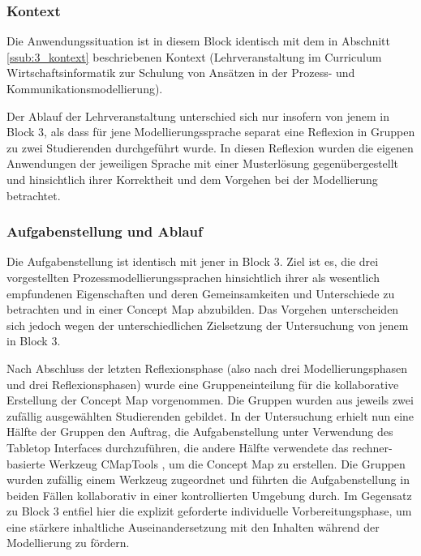 \subsubsection{Kontext} %
\label{ssub:5_kontext}

Die Anwendungssituation ist in diesem Block identisch mit dem in Abschnitt \ref{ssub:3_kontext} beschriebenen Kontext (Lehrveranstaltung im Curriculum Wirtschaftsinformatik zur Schulung von Ansätzen in der Prozess- und Kommunikationsmodellierung).

Der Ablauf der Lehrveranstaltung unterschied sich nur insofern von jenem in Block 3, als dass für jene Modellierungssprache separat eine Reflexion in Gruppen zu zwei Studierenden durchgeführt wurde. In diesen Reflexion wurden die eigenen Anwendungen der jeweiligen Sprache mit einer Musterlösung gegenübergestellt und hinsichtlich ihrer Korrektheit und dem Vorgehen bei der Modellierung betrachtet.


\subsubsection{Aufgabenstellung und Ablauf} %
\label{ssub:5_aufgabenstellung}

Die Aufgabenstellung ist identisch mit jener in Block 3. Ziel ist es, die drei vorgestellten Prozessmodellierungssprachen hinsichtlich ihrer als wesentlich empfundenen Eigenschaften und deren Gemeinsamkeiten und Unterschiede zu betrachten und in einer Concept Map abzubilden. Das Vorgehen unterscheiden sich jedoch wegen der unterschiedlichen Zielsetzung der Untersuchung von jenem in Block 3.

Nach Abschluss der letzten Reflexionsphase (also nach drei Modellierungsphasen und drei Reflexionsphasen) wurde eine Gruppeneinteilung für die kollaborative Erstellung der Concept Map vorgenommen. Die Gruppen wurden aus jeweils zwei zufällig ausgewählten Studierenden gebildet. In der Untersuchung erhielt nun eine Hälfte der Gruppen den Auftrag, die Aufgabenstellung unter Verwendung des Tabletop Interfaces durchzuführen, die andere Hälfte verwendete das rechner-basierte Werkzeug CMapTools \citep{Canas04}, um die Concept Map zu erstellen. Die Gruppen wurden zufällig einem Werkzeug zugeordnet und führten die Aufgabenstellung in beiden Fällen kollaborativ in einer kontrollierten Umgebung durch. Im Gegensatz zu Block 3 entfiel hier die explizit geforderte individuelle Vorbereitungsphase, um eine stärkere inhaltliche Auseinandersetzung mit den Inhalten während der Modellierung zu fördern. 

